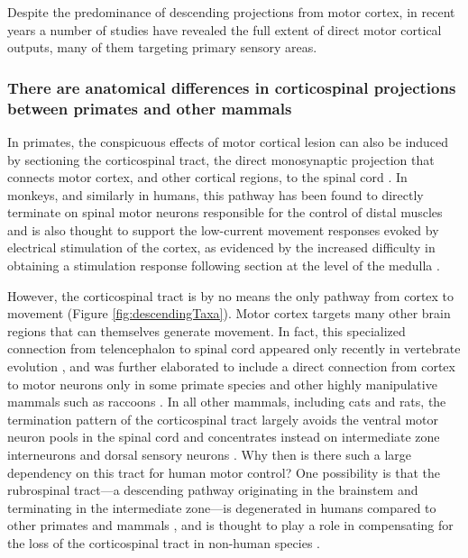 Despite the predominance of descending projections from motor cortex, in recent years a number of studies have revealed the full extent of direct motor cortical outputs, many of them targeting primary sensory areas.

\subsubsection*{There are anatomical differences in corticospinal projections between primates and other mammals}

In primates, the conspicuous effects of motor cortical lesion can also be induced by sectioning the corticospinal tract, the direct monosynaptic projection that connects motor cortex, and other cortical regions, to the spinal cord \cite{Tower1940,Lawrence1968}. In monkeys, and similarly in humans, this pathway has been found to directly terminate on spinal motor neurons responsible for the control of distal muscles \cite{Leyton1917,Bernhard1954} and is also thought to support the low-current movement responses evoked by electrical stimulation of the cortex, as evidenced by the increased difficulty in obtaining a stimulation response following section at the level of the medulla \cite{Woolsey1972}.

However, the corticospinal tract is by no means the only pathway from cortex to movement (Figure \ref{fig:descendingTaxa}). Motor cortex targets many other brain regions that can themselves generate movement. In fact, this specialized connection from telencephalon to spinal cord appeared only recently in vertebrate evolution \cite{TenDonkelaar2009}, and was further elaborated to include a direct connection from cortex to motor neurons only in some primate species and other highly manipulative mammals such as raccoons \cite{Heffner1983}. In all other mammals, including cats and rats, the termination pattern of the corticospinal tract largely avoids the ventral motor neuron pools in the spinal cord and concentrates instead on intermediate zone interneurons and dorsal sensory neurons \cite{Kuypers1981,Yang2003}. Why then is there such a large dependency on this tract for human motor control? One possibility is that the rubrospinal tract---a descending pathway originating in the brainstem and terminating in the intermediate zone---is degenerated in humans compared to other primates and mammals \cite{Nathan1955,Nathan1982}, and is thought to play a role in compensating for the loss of the corticospinal tract in non-human species \cite{Lawrence1968a,Zaaimi2012}.

